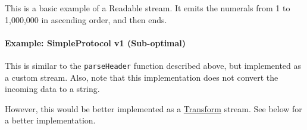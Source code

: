 This is a basic example of a Readable stream. It emits the numerals from
1 to 1,000,000 in ascending order, and then ends.

\begin{Shaded}
\begin{Highlighting}[]
 \NormalTok{(}\NormalTok{;}
 \NormalTok{(}\NormalTok{);}

 
  \NormalTok{(}
   \NormalTok{= }\NormalTok{;}
   \NormalTok{= }\NormalTok{;}
\NormalTok{\}}

 \NormalTok{= }\NormalTok{() \{}
   \NormalTok{++;}
   \NormalTok{)}
    \NormalTok{(}\NormalTok{);}
   \NormalTok{\{}
      
      \NormalTok{);}
  \NormalTok{\}}
\NormalTok{\};}
\end{Highlighting}
\end{Shaded}

\paragraph{Example: SimpleProtocol v1
(Sub-optimal)}\label{example-simpleprotocol-v1-sub-optimal}

This is similar to the \texttt{parseHeader} function described above,
but implemented as a custom stream. Also, note that this implementation
does not convert the incoming data to a string.

However, this would be better implemented as a
\hyperref[streamux5fclassux5fstreamux5ftransform]{Transform} stream. See
below for a better implementation.

